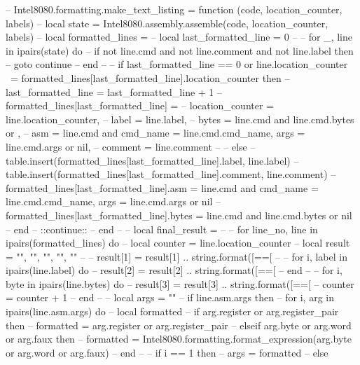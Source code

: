 -- Intel8080.formatting.make_text_listing = function (code, location_counter, labels)
--     local state = Intel8080.assembly.assemble(code, location_counter, labels)
--     local formatted_lines = {}
--     local last_formatted_line = 0
-- 
--     for _, line in ipairs(state) do
--         if not line.cmd and not line.comment and not line.label then
--             goto continue
--         end
-- 
--         if last_formatted_line == 0 or line.location_counter ~= formatted_lines[last_formatted_line].location_counter then
--             last_formatted_line = last_formatted_line + 1
--             formatted_lines[last_formatted_line] = {
--                 location_counter = line.location_counter,
--                 label = {line.label},
--                 bytes = line.cmd and line.cmd.bytes or {},
--                 asm = line.cmd and {cmd_name = line.cmd.cmd_name, args = line.cmd.args} or nil,
--                 comment = {line.comment}
--             }
--         else
--             table.insert(formatted_lines[last_formatted_line].label, line.label)
--             table.insert(formatted_lines[last_formatted_line].comment, line.comment)
--             formatted_lines[last_formatted_line].asm = line.cmd and {cmd_name = line.cmd.cmd_name, args = line.cmd.args} or nil
--             formatted_lines[last_formatted_line].bytes = line.cmd and line.cmd.bytes or nil
--         end
--         ::continue::
--     end
-- 
--     local final_result = {}
-- 
--     for line_no, line in ipairs(formatted_lines) do
--         local counter = line.location_counter
--         local result = {"", "", "", "", ""}
-- 
--         result[1] = result[1] .. string.format([==[%
-- 
--         for i, label in ipairs(line.label) do
--             result[2] = result[2] .. string.format([==[%
--         end
-- 
--         for i, byte in ipairs(line.bytes) do
--             result[3] = result[3] .. string.format([==[%
--             counter = counter + 1
--         end
-- 
--         local args = ""
--         if line.asm.args then
--             for i, arg in ipairs(line.asm.args) do
--                 local formatted
--                 if arg.register or arg.register_pair then
--                     formatted = arg.register or arg.register_pair
--                 elseif arg.byte or arg.word or arg.faux then
--                     formatted = Intel8080.formatting.format_expression(arg.byte or arg.word or arg.faux)
--                 end
-- 
--                 if i == 1 then
--                     args = formatted
--                 else
